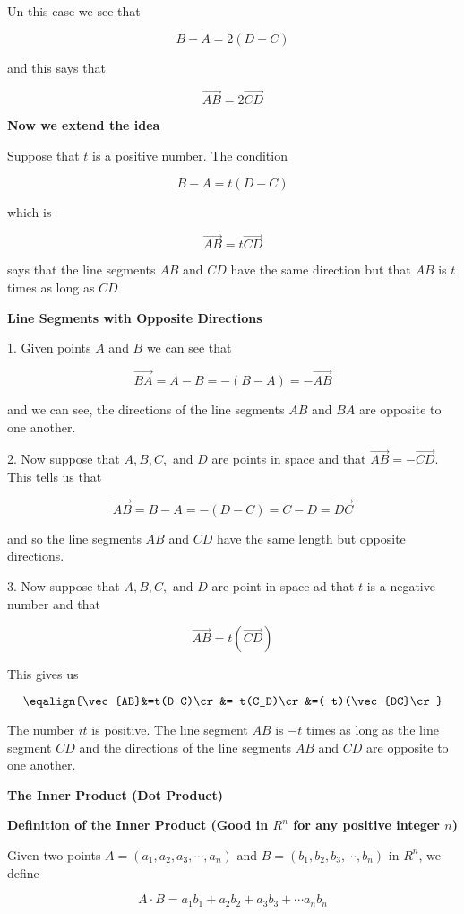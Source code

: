 Un this case we see that

$$B-A=2(D-C)$$

and this says that

$$\vec{AB}=2\vec{CD}$$

\vskip 1mm
{\bf Now we extend the idea}

\vskip 1mm
Suppose that $t$ is a positive number. The condition

$$B-A=t(D-C)$$

which is 

$$\vec{AB}=t\vec{CD}$$

says that the line segments $AB$ and $CD$ have the same direction but that $AB$ is $t$ times as long as $CD$

\filbreak
\vskip 1cm
{\bf Line Segments with Opposite Directions}

\vskip 1mm
1. Given points $A$ and $B$ we can see that

$$\vec{BA}=A-B=-(B-A)=-\vec{AB}$$

and we can see, the directions of the line segments $AB$ and $BA$ are opposite to one another.

\vskip 1mm
2. Now suppose that $A,B,C,$ and $D$ are points in space and that $\vec{AB}=-\vec{CD}$. This tells us that

$$\vec{AB}=B-A=-(D-C)=C-D=\vec{DC}$$

and so the line segments $AB$ and $CD$ have the same length but opposite directions.

\vskip 1mm
3. Now suppose that $A,B,C,$ and $D$ are point in space ad that $t$ is a negative number and that 

$$\vec{AB}=t(\vec{CD})$$

This gives us

$$\eqalign{\vec{AB}&=t(D-C)\cr
		&=-t(C_D)\cr
		&=(-t)(\vec{DC}\cr}$$

The number $it$ is positive. The line segment $AB$ is $-t$ times as long as the line segment $CD$ and the directions of the line segments $AB$ and $CD$ are opposite to one another.

\filbreak
\vskip 1cm
{\bf The Inner Product (Dot Product)}

\vskip 1mm
{\bf Definition of the Inner Product (Good in $R^n$ for any positive integer $n$)}

\vskip 1mm
Given two points $A=(a_1,a_2,a_3,\cdots,a_n)$ and $B=(b_1,b_2,b_3,\cdots,b_n)$ in $R^n$, we define

$$A\cdot B=a_1b_1+a_2b_2+a_3b_3+\cdots a_nb_n$$

